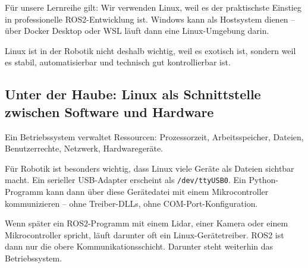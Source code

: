 \begin{loesungBox}
Für unsere Lernreihe gilt: Wir verwenden Linux, weil es der praktischste
Einstieg in professionelle ROS2-Entwicklung ist. Windows kann als Hostsystem
dienen -- über Docker Desktop oder WSL läuft dann eine Linux-Umgebung darin.
\end{loesungBox}

\begin{merksatzBox}
Linux ist in der Robotik nicht deshalb wichtig, weil es exotisch ist, sondern
weil es stabil, automatisierbar und technisch gut kontrollierbar ist.
\end{merksatzBox}

\begin{haubeBox}
\subsection*{Unter der Haube: Linux als Schnittstelle zwischen Software und Hardware}

Ein Betriebssystem verwaltet Ressourcen: Prozessorzeit, Arbeitsspeicher,
Dateien, Benutzerrechte, Netzwerk, Hardwaregeräte.

Für Robotik ist besonders wichtig, dass Linux viele Geräte als Dateien
sichtbar macht. Ein serieller USB-Adapter erscheint als \texttt{/dev/ttyUSB0}.
Ein Python-Programm kann dann über diese Gerätedatei mit einem Mikrocontroller
kommunizieren -- ohne Treiber-DLLs, ohne COM-Port-Konfiguration.
\end{haubeBox}

\begin{robotikBox}
Wenn später ein ROS2-Programm mit einem Lidar, einer Kamera oder einem
Mikrocontroller spricht, läuft darunter oft ein Linux-Gerätetreiber. ROS2
ist dann nur die obere Kommunikationsschicht. Darunter steht weiterhin das
Betriebssystem.
\end{robotikBox}
